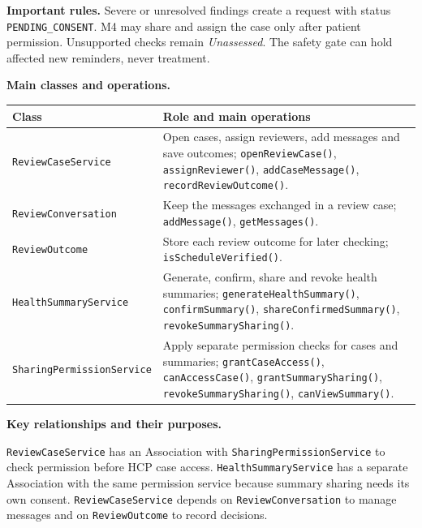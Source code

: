 \documentclass[10pt,letterpaper]{article}
\begin{document}
\noindent\textbf{Important rules.} Severe or unresolved findings create a request
with status \texttt{PENDING\_CONSENT}. M4 may share and assign the case only
after patient permission. Unsupported checks remain \emph{Unassessed}.
The safety gate can hold affected new reminders, never treatment.



\noindent\textbf{Main classes and operations.}\par\smallskip
\begingroup\small
\noindent\begin{tabularx}{\textwidth}{|L{0.37\textwidth}|Y|}
\hline
\textbf{Class} & \textbf{Role and main operations} \\ \hline
\texttt{ReviewCaseService} & Open cases, assign reviewers, add messages and save outcomes; \texttt{openReviewCase()}, \texttt{assignReviewer()}, \texttt{addCaseMessage()}, \texttt{recordReviewOutcome()}. \\ \hline
\texttt{ReviewConversation} & Keep the messages exchanged in a review case; \texttt{addMessage()}, \texttt{getMessages()}. \\ \hline
\texttt{ReviewOutcome} & Store each review outcome for later checking; \texttt{isScheduleVerified()}. \\ \hline
\texttt{HealthSummaryService} & Generate, confirm, share and revoke health summaries; \texttt{generateHealthSummary()}, \texttt{confirmSummary()}, \texttt{shareConfirmedSummary()}, \texttt{revokeSummarySharing()}. \\ \hline
\texttt{SharingPermissionService} & Apply separate permission checks for cases and summaries; \texttt{grantCaseAccess()}, \texttt{canAccessCase()}, \texttt{grantSummarySharing()}, \texttt{revokeSummarySharing()}, \texttt{canViewSummary()}. \\ \hline
\end{tabularx}\par
\endgroup

\noindent\textbf{Key relationships and their purposes.}\par\smallskip
\texttt{ReviewCaseService} has an Association with
\texttt{SharingPermissionService} to check permission before HCP case
access. \texttt{HealthSummaryService} has a separate Association with
the same permission service because summary sharing needs its own consent.
\texttt{ReviewCaseService} depends on \texttt{ReviewConversation} to
manage messages and on \texttt{ReviewOutcome} to record decisions.
\end{document}
